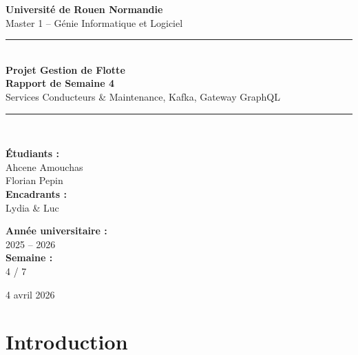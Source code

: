 \documentclass[12pt,a4paper]{article}
\begin{document}
\begin{titlepage}
  \centering
  \vspace*{1cm}

  {\Large\textbf{Universit\'{e} de Rouen Normandie}\\[0.3cm]
  \large Master 1 -- G\'{e}nie Informatique et Logiciel}

  \vspace{1.5cm}
  {\color{primary!55}\rule{\linewidth}{0.5mm}}\\[0.45cm]

  {\Huge\sffamily\bfseries\color{primary} Projet Gestion de Flotte\\[0.35cm]}
  {\LARGE\sffamily\bfseries\color{primary!80!black} Rapport de Semaine 4}\\[0.35cm]
  {\large\sffamily\color{primary!65!black} Services Conducteurs \& Maintenance, Kafka, Gateway GraphQL}

  {\color{primary!55}\rule{\linewidth}{0.5mm}}\\[1.5cm]

  \begin{minipage}{0.45\textwidth}
    \begin{flushleft}
      \textbf{\'{E}tudiants :}\\
      Ahcene Amouchas \\
      Florian Pepin \\[0.5cm]
      \textbf{Encadrants :}\\
      Lydia \& Luc
    \end{flushleft}
  \end{minipage}
  \hfill
  \begin{minipage}{0.45\textwidth}
    \begin{flushright}
      \textbf{Ann\'{e}e universitaire :}\\
      2025 -- 2026 \\[0.5cm]
      \textbf{Semaine :}\\
      4 / 7
    \end{flushright}
  \end{minipage}

  \vfill
  {\large 4 avril 2026}
\end{titlepage}

\tableofcontents
\newpage

\section{Introduction}
\end{document}
